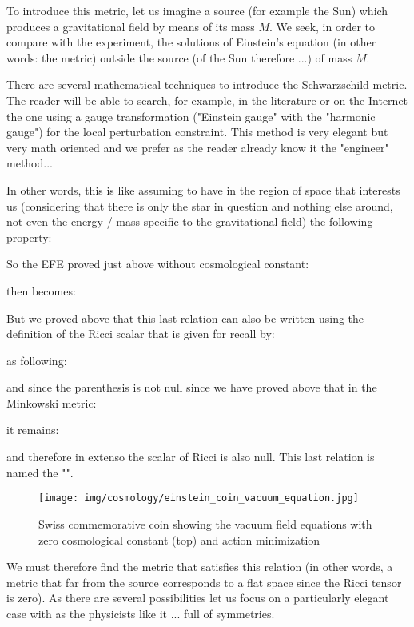 	To introduce this metric, let us imagine a source (for example the Sun) which produces a gravitational field by means of its mass $M$. We seek, in order to compare with the experiment, the solutions of Einstein's equation (in other words: the metric) outside the source (of the Sun therefore ...) of mass $M$.
	\begin{tcolorbox}[title=Remark,colframe=black,arc=10pt]
	There are several mathematical techniques to introduce the Schwarzschild metric. The reader will be able to search, for example, in the literature or on the Internet the one using a gauge transformation ("Einstein gauge" with the "harmonic gauge") for the local perturbation constraint. This method is very elegant but very math oriented and we prefer as the reader already know it the "engineer" method...
	\end{tcolorbox}
	In other words, this is like assuming to have in the region of space that interests us (considering that there is only the star in question and nothing else around, not even the energy / mass specific to the gravitational field) the following property:
	
	So the EFE proved just above without cosmological constant:
	
	then becomes:
	
	But we proved above that this last relation can also be written using the definition of the Ricci scalar that is given for recall by:
	
	as following:
	
	and since the parenthesis is not null since we have proved above that in the Minkowski metric:
	
	it remains:
	
	and therefore in extenso the scalar of Ricci is also null. This last relation is named the "".
	\begin{figure}[H]
		\centering
		\texttt{[image: img/cosmology/einstein\_coin\_vacuum\_equation.jpg]}	
		\caption{Swiss commemorative coin showing the vacuum field equations with zero cosmological constant (top) and action minimization}
	\end{figure}
	We must therefore find the metric that satisfies this relation (in other words, a metric that far from the source corresponds to a flat space since the Ricci tensor is zero). As there are several possibilities let us focus on a particularly elegant case with as the physicists like it ... full of symmetries.


